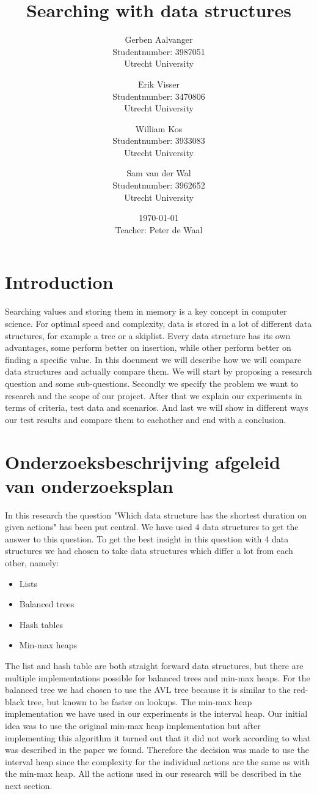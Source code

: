 \documentclass{article}
\title{Searching with data structures}
\author{
		Gerben Aalvanger\\ 
	        	Studentnumber: 3987051 \\
	        	Utrecht University
			\and
		Erik Visser\\
	        	Studentnumber: 3470806 \\
	        	Utrecht University
	        	\and
	        	William Kos\\
	        	Studentnumber: 3933083\\
	        	Utrecht University\\
	        	\and
	        	Sam van der Wal\\
	        	Studentnumber: 3962652\\
	        	Utrecht University}
\date{\today \\Teacher: Peter de Waal}
\begin{document}
\maketitle
\section{Introduction}
Searching values and storing them in memory is a key concept in computer science. For optimal speed and complexity, data is stored in a lot of different data structures, for example a tree or a skiplist. Every data structure has its own advantages, some perform better on insertion, while other perform better on finding a specific value. In this document we will describe how we will compare data structures and actually compare them. We will start by proposing a research question and some sub-questions. Secondly we specify the problem we want to research and the scope of our project. After that we explain our experiments in terms of criteria, test data and scenarios. And last we will show in different ways our test results and compare them to eachother and end with a conclusion. 

\section{Onderzoeksbeschrijving afgeleid van onderzoeksplan}
In this research the question "Which data structure has the shortest duration on given actions" has been put central. We have used 4 data structures to get the answer to this question. To get the best insight in this question with 4 data structures we had chosen to take data structures which differ a lot from each other, namely:
\begin{itemize}
\item Lists
\item Balanced trees
\item Hash tables
\item Min-max heaps
\end{itemize}
The list and hash table are both straight forward data structures, but there are multiple implementations possible for balanced trees and min-max heaps. For the balanced tree we had chosen to use the AVL tree because it is similar to the red-black tree, but known to be faster on lookups. The min-max heap implementation we have used in our experiments is the interval heap. Our initial idea was to use the original min-max heap implementation but after implementing this algorithm it turned out that it did not work according to what was described in the paper we found. Therefore the decision was made to use the interval heap since the complexity for the individual actions are the same as with the min-max heap. All the actions used in our research will be described in the next section.
\end{document}

